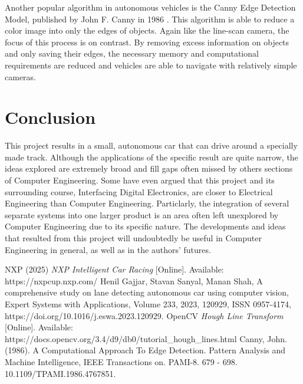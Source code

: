 \documentclass[conference]{IEEEtran}
\begin{document}
    Another popular algorithm in autonomous vehicles is the Canny Edge
    Detection Model, published by John F. Canny in 1986 \cite{b4}. This algorithm is
    able to reduce a color image into only the edges of objects. Again like
    the line-scan camera, the focus of this process is on contrast. By
    removing excess information on objects and only saving their edges, the
    necessary memory and computational requirements are reduced and vehicles
    are able to navigate with relatively simple cameras.

\section{Conclusion}
    This project results in a small, autonomous car that can drive around a specially made track. Although the applications
    of the specific result are quite narrow, the ideas explored are extremely broad and fill gaps often missed by others sections
    of Computer Engineering. Some have even argued that this project and its surrounding course, Interfacing Digital Electronics, are
    closer to Electrical Engineering than Computer Engineering. Particlarly, the integration of several separate systems into one larger
    product is an area often left unexplored by Computer Engineering due to its specific nature. The developments and ideas that resulted
    from this project will undoubtedly be useful in Computer Engineering in general, as well as in the authors' futures.


\begin{thebibliography}{00}
    NXP (2025) \emph{NXP Intelligent Car Racing} [Online]. Available: https://nxpcup.nxp.com/
    Henil Gajjar, Stavan Sanyal, Manan Shah, A comprehensive study on lane detecting autonomous car using computer vision,
    Expert Systems with Applications, Volume 233, 2023, 120929, ISSN 0957-4174, https://doi.org/10.1016/j.eswa.2023.120929.
    OpenCV \emph{Hough Line Transform} [Online]. Available: https://docs.opencv.org/3.4/d9/db0/tutorial\_hough\_lines.html
    Canny, John. (1986). A Computational Approach To Edge Detection. Pattern Analysis and Machine Intelligence, IEEE Transactions on. PAMI-8. 679 - 698. 10.1109/TPAMI.1986.4767851.
    \end{thebibliography}
\end{document}
